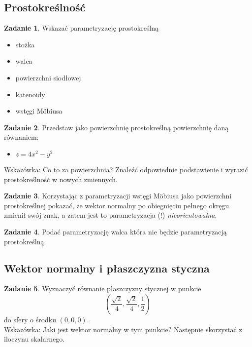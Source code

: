 \documentclass[a4paper,11pt]{article}
\theoremstyle{definition}\newtheorem{exercise}{Zadanie}
\theoremstyle{definition}\newtheorem{remark}{Uwaga}
\begin{document}
\subsection{Prostokreślność}

\begin{exercise}
 Wskazać parametryzację prostokreślną
 \begin{itemize}
  \item stożka
  \item walca
  \item powierzchni siodłowej
  \item katenoidy
  \item wstęgi M\"obiusa
 \end{itemize}

\end{exercise}

\begin{exercise}
Przedstaw jako powierzchnię prostokreślną powierzchnię daną równaniem: 

\begin{itemize}
 \item $z=4x^2-y^2$
\end{itemize}
 \small{Wskazówka: Co to za powierzchnia? Znaleźć 
odpowiednie podstawienie i wyrazić prostokreślność w nowych zmiennych.}
\end{exercise}


\begin{exercise}
Korzystając z parametryzacji wstęgi M\"obiusa jako powierzchni prostokreślnej 
pokazać, że wektor normalny po obiegnięciu pełnego okręgu zmienił sw\'oj znak, a 
zatem jest to parametryzacja (!) \textit{nieorientowalna}.
\end{exercise}

\begin{exercise}
Podać parametryzację walca która nie będzie parametryzacją prostokreślną.
\end{exercise}

\subsection{Wektor normalny i płaszczyzna styczna}

\begin{exercise}
Wyznaczyć równanie płaszczyzny stycznej w punkcie 
\[\left(\frac{\sqrt{2}}{4},\frac{\sqrt{2}}{4},\frac{1}{2}\right)\] do sfery o 
środku $(0,0,0)$.\\[0.1in]
\small{Wskazówka: Jaki jest wektor normalny w tym punkcie? Następnie skorzystać 
z iloczynu skalarnego.}
 \end{exercise}
\end{document}
